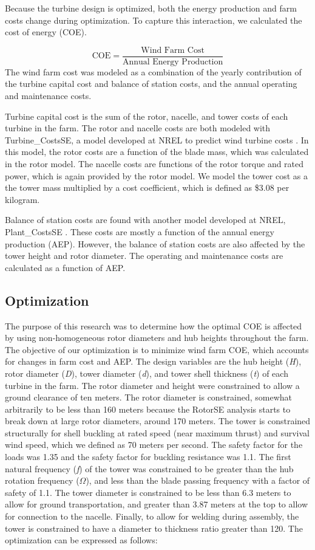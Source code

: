 \documentclass[conf]{new-aiaa}
\begin{document}
Because the turbine design is optimized, both the energy production and farm costs change during optimization. To capture this interaction, we calculated the cost of energy (COE). 

$$\text{COE}=\frac{\text{Wind Farm Cost}}{\text{Annual Energy Production}}$$
The wind farm cost was modeled as a combination of the yearly contribution of the turbine capital cost and balance of station costs, and the annual operating and maintenance costs. 

Turbine capital cost is the sum of the rotor, nacelle, and tower costs of each turbine in the farm. The rotor and nacelle costs are both modeled with Turbine\_CostsSE, a model developed at NREL to predict wind turbine costs \cite{dykes2012turbine}. In this model, the rotor costs are a function of the blade mass, which was calculated in the rotor model. The nacelle costs are functions of the rotor torque and rated power, which is again provided by the rotor model. We model the tower cost as a the tower mass multiplied by a cost coefficient, which is defined as \$3.08 per kilogram.

Balance of station costs are found with another model developed at NREL, Plant\_CostsSE \cite{dykes2014plant_costsse}. These costs are mostly a function of the annual energy production (AEP). However, the balance of station costs are also affected by the tower height and rotor diameter. The operating and maintenance costs are calculated as a function of AEP.

\subsection{Optimization}

The purpose of this research was to determine how the optimal COE is affected by using non-homogeneous rotor diameters and hub heights throughout the farm. The objective of our optimization is to minimize wind farm COE, which accounts for changes in farm cost and AEP. The design variables are the hub height (\textit{H}), rotor diameter (\textit{D}), 
tower diameter (\textit{d}), and tower shell thickness (\textit{t}) of each turbine in the farm. The rotor diameter and height were constrained to allow a ground clearance of ten meters. The rotor diameter is constrained, somewhat arbitrarily to be less than 160 meters because the RotorSE analysis starts to break down at large rotor diameters, around 170 meters. The tower is constrained structurally for shell buckling at rated speed (near maximum thrust) and survival wind speed, which we defined as 70 meters per second. The safety factor for the loads was 1.35 and the safety factor for buckling resistance was 1.1. The first natural frequency (\textit{f}) of the tower was constrained to be greater than the hub rotation frequency (\textit{$\Omega$}), and less than the blade passing frequency with a factor of safety of 1.1. The tower diameter is constrained to be less than 6.3 meters to allow for ground transportation, and greater than 3.87 meters at the top to allow for connection to the nacelle. Finally, to allow for welding during assembly, the tower is constrained to have a diameter to thickness ratio greater than 120. The optimization can be expressed as follows:
\end{document}
